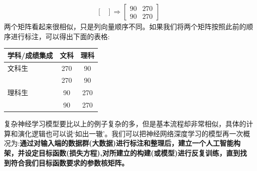 \documentclass[12pt]{article}
\numberwithin{figure}{section}
\numberwithin{equation}{section}
\begin{document}
\begin{example}
\begin{align*}
\begin{bmatrix}
	\end{bmatrix} \Rightarrow \begin{bmatrix}
		90 & 270 \\
		90 & 270 
	\end{bmatrix}
\end{align*}
两个矩阵看起来很相似，只是列向量顺序不同。如果我们将两个矩阵按照此前的顺序进行标注，可以得出下面的表格:
\begin{table}[H]
\renewcommand{\arraystretch}{1.2}
	\centering
	\begin{tabular}{|l|cc|}
	\hline 
		学科/成绩集成 & 文科 & 理科 \\
		\hline 
		文科生& 270 & 90 \\
		& 270 & 90 \\
		\hline 
		理科生& 90 & 270 \\
		& 90 & 270 \\
		\hline 
	\end{tabular}
\end{table}
\end{example}

复杂神经学习模型要比以上的例子复杂的多，但是基本流程却非常相似，具体的计算和演化逻辑也可以说`如出一辙'。我们可以把神经网络深度学习的模型再一次概况为:\textbf{通过对输入端的数据群(大数据)进行标注和整理后，建立一个人工智能构架，并设定目标函数(损失方程),对所建立的构建(或模型)进行反复训练，直到找到符合我们目标函数要求的参数核矩阵。}
\end{document}
